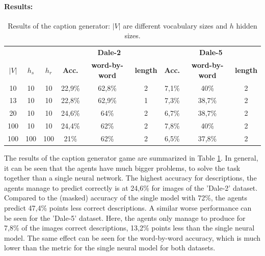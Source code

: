 \paragraph*{Results:}
\begin{table}[h]
    \centering
    \begin{tabular}{ccc|ccc|ccc}
        \toprule
              &         &         & \multicolumn{3}{c}{\textbf{Dale-2}} & \multicolumn{3}{c}{\textbf{Dale-5}}                                                                             \\\cmidrule(lr){4-6}\cmidrule(lr){7-9}
        $|V|$ & $h_{s}$ & $h_{r}$ & \textbf{Acc.}                       & \textbf{word-by-word}               & \textbf{length} & \textbf{Acc.} & \textbf{word-by-word} & \textbf{length} \\\midrule
        {10}  & {10}    & {10}    & {22,9\%}                            & {62,8\%}                            & {2}             & {7,1\%}       & {40\%}                & {2}             \\
        {13}  & {10}    & {10}    & {22,8\%}                            & {62,9\%}                            & {1}             & {7,3\%}       & {38,7\%}              & {2}             \\
        {20}  & {10}    & {10}    & {24,6\%}                            & {64\%}                              & {2}             & {6,7\%}       & {38,7\%}              & {2}             \\
        {100} & {10}    & {10}    & {24,4\%}                            & {62\%}                              & {2}             & {7,8\%}       & {40\%}                & {2}             \\
        {100} & {100}   & {100}   & {21\%}                              & {62\%}                              & {2}             & {6,5\%}       & {37,8\%}              & {2}             \\
        \bottomrule
    \end{tabular}
    \caption{Results of the caption generator: $|V|$ are different vocabulary sizes and $h$ hidden sizes.}
    \label{tab:results_caption_generator_game}
\end{table}

The results of the caption generator game are summarized in Table \ref{tab:results_caption_generator_game}.
In general, it can be seen that the agents have much bigger problems, to solve the task together than a single neural network.
The highest accuracy for descriptions, the agents manage to predict correctly is at 24,6\% for images of the 'Dale-2' dataset.
Compared to the (masked) accuracy of the single model with 72\%, the agents predict 47,4\% points less correct descriptions.
A similar worse performance can be seen for the 'Dale-5' dataset.
Here, the agents only manage to produce for 7,8\% of the images correct descriptions, 13,2\% points less than the single neural model.
The same effect can be seen for the word-by-word accuracy, which is much lower than the metric for the single neural model for both datasets.

